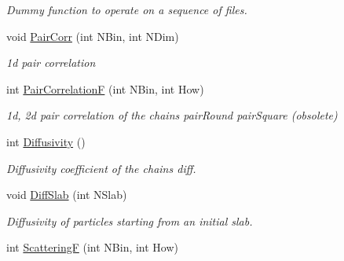 \begin{DoxyCompactItemize}
\begin{DoxyCompactList}\small\item\em \-Dummy function to operate on a sequence of files. \end{DoxyCompactList}\item 
\hypertarget{classElPoly_a56b4b9780b4f84eb1713ca48b49fbbb2}{void \hyperlink{classElPoly_a56b4b9780b4f84eb1713ca48b49fbbb2}{\-Pair\-Corr} (int \-N\-Bin, int \-N\-Dim)}\label{classElPoly_a56b4b9780b4f84eb1713ca48b49fbbb2}

\begin{DoxyCompactList}\small\item\em 1d pair correlation \end{DoxyCompactList}\item 
\hypertarget{classElPoly_a7a3305d9ff38757faf367ced9abf89f0}{int \hyperlink{classElPoly_a7a3305d9ff38757faf367ced9abf89f0}{\-Pair\-Correlation\-F} (int \-N\-Bin, int \-How)}\label{classElPoly_a7a3305d9ff38757faf367ced9abf89f0}

\begin{DoxyCompactList}\small\item\em 1d, 2d pair correlation of the chains  pair\-Round pair\-Square (obsolete) \end{DoxyCompactList}\item 
\hypertarget{classElPoly_a2f4aa8dc1e4dce0dc8fcb1d4b161757b}{int \hyperlink{classElPoly_a2f4aa8dc1e4dce0dc8fcb1d4b161757b}{\-Diffusivity} ()}\label{classElPoly_a2f4aa8dc1e4dce0dc8fcb1d4b161757b}

\begin{DoxyCompactList}\small\item\em \-Diffusivity coefficient of the chains  diff. \end{DoxyCompactList}\item 
\hypertarget{classElPoly_abf879a7d0b86a5eed8a5be87dc741200}{void \hyperlink{classElPoly_abf879a7d0b86a5eed8a5be87dc741200}{\-Diff\-Slab} (int \-N\-Slab)}\label{classElPoly_abf879a7d0b86a5eed8a5be87dc741200}

\begin{DoxyCompactList}\small\item\em \-Diffusivity of particles starting from an initial slab. \end{DoxyCompactList}\item 
\hypertarget{classElPoly_a1aa4889418bf8c589875e1c77b5262d2}{int \hyperlink{classElPoly_a1aa4889418bf8c589875e1c77b5262d2}{\-Scattering\-F} (int \-N\-Bin, int \-How)}\label{classElPoly_a1aa4889418bf8c589875e1c77b5262d2}


\end{DoxyCompactItemize}
